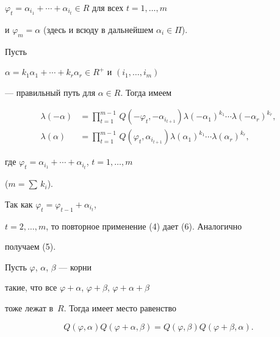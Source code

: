 $\varphi_t=\alpha_{i_1}+\dotsb+\alpha_{i_t}\in R$ для всех $t=1,\dotsc,m$


и $\varphi_m=\alpha$ (здесь и всюду в дальнейшем $\alpha_i\in\Pi$).





\begin{cor}


Пусть


$\alpha=k_1\alpha_1+\dotsb+k_r\alpha_r\in R^+$ и $(i_1,\dotsc,i_m)$


--- правильный путь для $\alpha\in R$. Тогда имеем


\begin{align}


\lambda(-\alpha)&=\prod_{t=1}^{m-1}\,Q(-\varphi_t,-\alpha_{i_{t+1}})


\lambda(-\alpha_1)^{k_1}\dotsb\lambda(-\alpha_r)^{k_r},\\


%


\lambda(\alpha)&=\prod_{t=1}^{m-1}\,Q(\varphi_t,\alpha_{i_{t+1}})


\lambda(\alpha_1)^{k_1}\dotsb\lambda(\alpha_r)^{k_r},


\end{align}


где $\varphi_t=\alpha_{i_1}+\dotsb+\alpha_{i_t}$, $t=1,\dotsc,m$


($m=\sum\,k_i$).


\end{cor}





\begin{pf}


Так как $\varphi_t=\varphi_{t-1}+\alpha_{i_t}$,


$t=2,\dotsc,m$, то повторное применение (4) дает (6). Аналогично


получаем (5).


\end{pf}





\begin{lem}


Пусть $\varphi$, $\alpha$, $\beta$ --- корни


такие, что все $\varphi+\alpha$, $\varphi+\beta$, $\varphi+\alpha+\beta$


тоже лежат в~$R$. Тогда имеет место равенство


\begin{equation}


Q(\varphi,\alpha)Q(\varphi+\alpha,\beta)=


Q(\varphi,\beta)Q(\varphi+\beta,\alpha).


\end{equation}


\end{lem}





